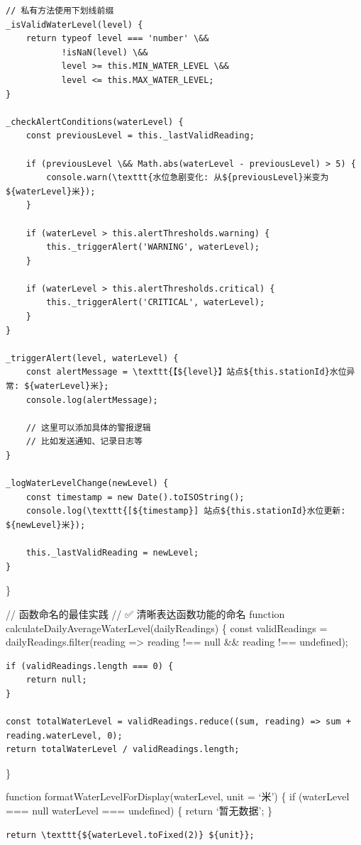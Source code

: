 {{\begin{verbatim}
// 私有方法使用下划线前缀
_isValidWaterLevel(level) {
    return typeof level === 'number' \&& 
           !isNaN(level) \&& 
           level >= this.MIN_WATER_LEVEL \&& 
           level <= this.MAX_WATER_LEVEL;
}

_checkAlertConditions(waterLevel) {
    const previousLevel = this._lastValidReading;
    
    if (previousLevel \&& Math.abs(waterLevel - previousLevel) > 5) {
        console.warn(\texttt{水位急剧变化: 从${previousLevel}米变为${waterLevel}米});
    }
    
    if (waterLevel > this.alertThresholds.warning) {
        this._triggerAlert('WARNING', waterLevel);
    }
    
    if (waterLevel > this.alertThresholds.critical) {
        this._triggerAlert('CRITICAL', waterLevel);
    }
}

_triggerAlert(level, waterLevel) {
    const alertMessage = \texttt{【${level}】站点${this.stationId}水位异常: ${waterLevel}米};
    console.log(alertMessage);
    
    // 这里可以添加具体的警报逻辑
    // 比如发送通知、记录日志等
}

_logWaterLevelChange(newLevel) {
    const timestamp = new Date().toISOString();
    console.log(\texttt{[${timestamp}] 站点${this.stationId}水位更新: ${newLevel}米});
    
    this._lastValidReading = newLevel;
}
\end{verbatim}

\}

// 函数命名的最佳实践 // ✅ 清晰表达函数功能的命名 function calculateDailyAverageWaterLevel(dailyReadings) \{ const validReadings = dailyReadings.filter(reading =\textgreater{} reading !== null \&\& reading !== undefined);

\begin{verbatim}
if (validReadings.length === 0) {
    return null;
}

const totalWaterLevel = validReadings.reduce((sum, reading) => sum + reading.waterLevel, 0);
return totalWaterLevel / validReadings.length;
\end{verbatim}

\}

function formatWaterLevelForDisplay(waterLevel, unit = `米') \{ if (waterLevel === null \textbar\textbar{} waterLevel === undefined) \{ return `暂无数据'; \}

\begin{verbatim}
return \texttt{${waterLevel.toFixed(2)} ${unit}};
\end{verbatim}

}}
